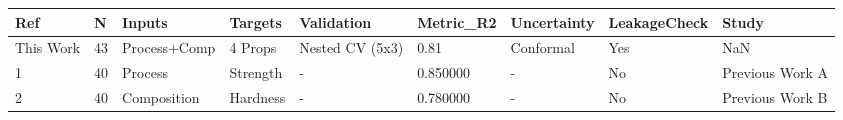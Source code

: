 \begin{tabular}{lllllllll}
\toprule
Ref & N & Inputs & Targets & Validation & Metric_R2 & Uncertainty & LeakageCheck & Study \\
\midrule
This Work & 43 & Process+Comp & 4 Props & Nested CV (5x3) & 0.81 & Conformal & Yes & NaN \\
1 & 40 & Process & Strength & - & 0.850000 & - & No & Previous Work A \\
2 & 40 & Composition & Hardness & - & 0.780000 & - & No & Previous Work B \\
\bottomrule
\end{tabular}

